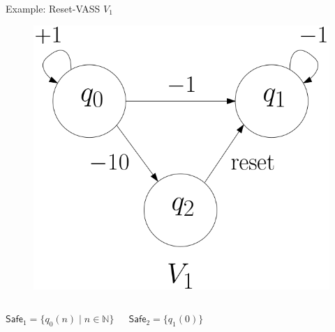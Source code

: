 \documentclass{beamer}
\newcommand{\N}{\mathbb{N}}
\newcommand{\Safe}{\textsf{Safe}}
\begin{document}
  \begin{frame}{Example: Reset-VASS $V_1$}
  
  
   \begin{center}
 	\begin{figure}
 	\vspace{.06cm}
\includegraphics[width=.4\textwidth]{FigA}
	\end{figure}
\end{center}  


\begin{columns}[T]

$\Safe_1 = \{q_0(n) \mid n \in \N\}$

\vspace{0.1cm}

$\Safe_2 = \{q_1(0)\} $




 

\vspace{0.1cm}


\end{columns}


  \end{frame}
\end{document}
